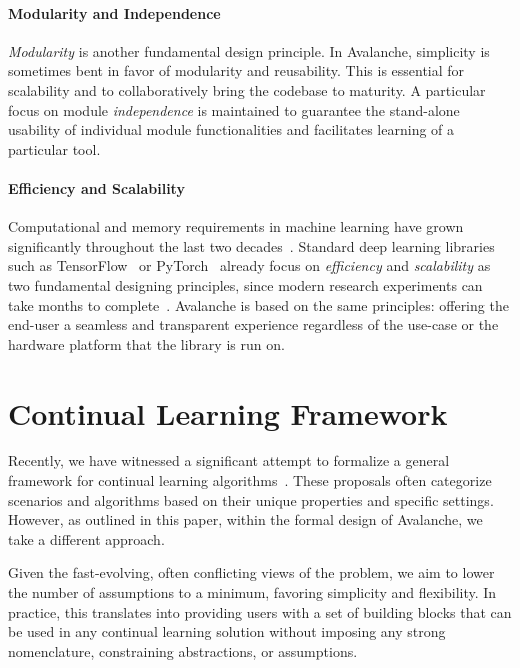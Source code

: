 \documentclass[final]{cvpr}
\theoremstyle{definition}
\begin{document}
\paragraph{Modularity and Independence} \emph{Modularity} is another fundamental design principle. In Avalanche, simplicity is sometimes bent in favor of modularity and reusability. This is essential for scalability and to collaboratively bring the codebase to maturity. A particular focus on module \emph{independence} is maintained to guarantee the stand-alone usability of individual module functionalities and facilitates learning of a particular tool.

\paragraph{Efficiency and Scalability} Computational and memory requirements in machine learning have grown significantly throughout the last two decades~\cite{thompson2020computational}. Standard deep learning libraries such as TensorFlow~\cite{tensorflow2015-whitepaper} or PyTorch~\cite{paszke2019pytorch} already focus on \emph{efficiency} and \emph{scalability} as two fundamental designing principles, since modern research experiments can take months to complete~\cite{schwartz2019green}. Avalanche is based on the same principles: offering the end-user a seamless and transparent experience regardless of the use-case or the hardware platform that the library is run on.

\section{Continual Learning Framework}
\label{sec:framework}

Recently, we have witnessed a significant attempt to formalize a general framework for continual learning algorithms~\cite{lomonaco2019, lomonaco2020, vandeven2018a}. These proposals often categorize scenarios and algorithms based on their unique properties and specific settings. However, as outlined in this paper, within the formal design of Avalanche, we take a different approach. 

Given the fast-evolving, often conflicting views of the problem, we aim to lower the number of assumptions to a minimum, favoring simplicity and flexibility. In practice, this translates into providing users with a set of building blocks that can be used in any continual learning solution without imposing any strong nomenclature, constraining abstractions, or assumptions.
\end{document}

